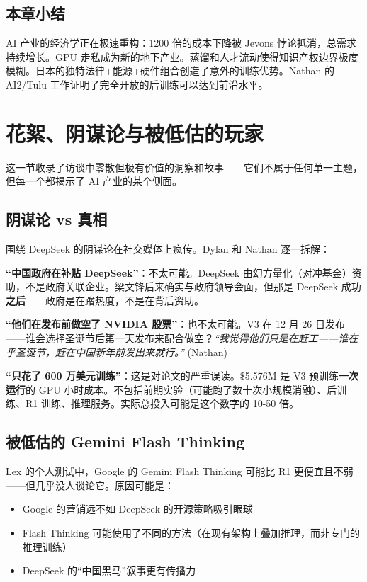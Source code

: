 \documentclass[a4paper]{article}
\begin{document}
\subsection{本章小结}

AI 产业的经济学正在极速重构：1200 倍的成本下降被 Jevons 悖论抵消，总需求持续增长。GPU 走私成为新的地下产业。蒸馏和人才流动使得知识产权边界极度模糊。日本的独特法律+能源+硬件组合创造了意外的训练优势。Nathan 的 AI2/Tulu 工作证明了完全开放的后训练可以达到前沿水平。

\section{花絮、阴谋论与被低估的玩家}

这一节收录了访谈中零散但极有价值的洞察和故事——它们不属于任何单一主题，但每一个都揭示了 AI 产业的某个侧面。

\subsection{阴谋论 vs 真相}

围绕 DeepSeek 的阴谋论在社交媒体上疯传。Dylan 和 Nathan 逐一拆解：

\textbf{``中国政府在补贴 DeepSeek''}：不太可能。DeepSeek 由幻方量化（对冲基金）资助，不是政府关联企业。梁文锋后来确实与政府领导会面，但那是 DeepSeek 成功\textbf{之后}——政府是在蹭热度，不是在背后资助。

\textbf{``他们在发布前做空了 NVIDIA 股票''}：也不太可能。V3 在 12 月 26 日发布——谁会选择圣诞节后第一天发布来配合做空？\textit{``我觉得他们只是在赶工——谁在乎圣诞节，赶在中国新年前发出来就行。''} (Nathan)

\textbf{``只花了 600 万美元训练''}：这是对论文的严重误读。\$5.576M 是 V3 预训练\textbf{一次运行}的 GPU 小时成本。不包括前期实验（可能跑了数十次小规模消融）、后训练、R1 训练、推理服务。实际总投入可能是这个数字的 10-50 倍。

\subsection{被低估的 Gemini Flash Thinking}

Lex 的个人测试中，Google 的 Gemini Flash Thinking 可能比 R1 更便宜且不弱——但几乎没人谈论它。原因可能是：
\begin{itemize}
    \item Google 的营销远不如 DeepSeek 的开源策略吸引眼球
    \item Flash Thinking 可能使用了不同的方法（在现有架构上叠加推理，而非专门的推理训练）
    \item DeepSeek 的``中国黑马''叙事更有传播力
\end{itemize}
\end{document}
